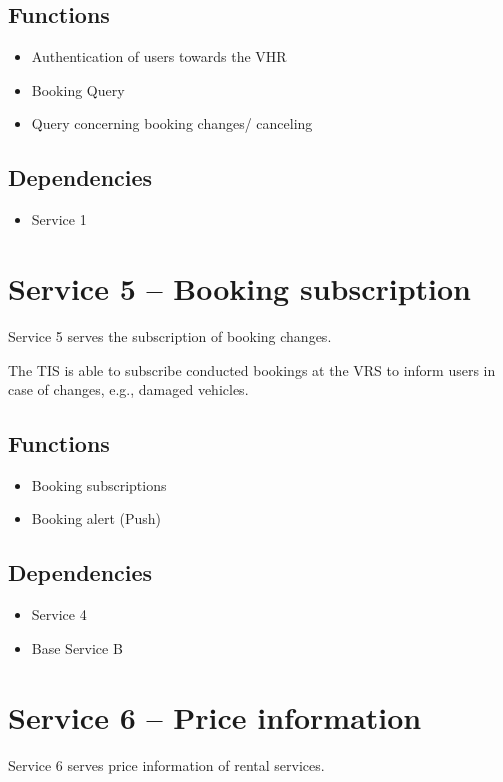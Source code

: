 \subsection*{Functions}
\begin{itemize}
\item Authentication of users towards the VHR 
\item Booking Query
\item Query concerning booking changes/ canceling
\end{itemize}

\subsection*{Dependencies}
\begin{itemize}
\item Service 1
\end{itemize}

\section{Service 5 -- Booking subscription}
\label{sec:Hierachiemodell:Dienst5}
Service 5 serves the subscription of booking changes.

The TIS is able to subscribe conducted bookings at the VRS to inform users in case of changes, e.g., damaged vehicles.
\subsection*{Functions}
\begin{itemize}
\item Booking subscriptions 
\item Booking alert (Push)
\end{itemize}

\subsection*{Dependencies}
\begin{itemize}
\item Service 4
\item Base Service B
\end{itemize}

\section{Service 6 -- Price information}
\label{sec:Hierachiemodell:Dienst6}
Service 6 serves price information of rental services.

